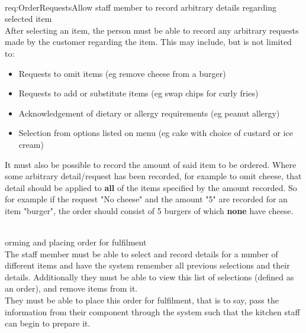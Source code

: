 \documentclass[11pt, a4paper]{report}
\def\itempar#1\\{\item \textbf{#1}\\} %
\begin{document}
\begin{enumerate}[label=F-UR-\arabic*, series=functional]
\begin{enumerate}[label*=.\arabic*]
\itempar \label{req:OrderRequests}Allow staff member to record arbitrary details regarding selected item\\
After selecting an item, the person must be able to record any arbitrary requests made by the customer regarding the item. This may include, but is not limited to: 
\begin{itemize}
\item Requests to omit items (eg remove cheese from a burger)
\item Requests to add or substitute items (eg swap chips for curly fries)
\item Acknowledgement of dietary or allergy requirements (eg peanut allergy)
\item Selection from options listed on menu (eg cake with choice of custard or ice cream)
\end{itemize}
It must also be possible to record the amount of said item to be ordered. Where some arbitrary detail/request has been recorded, for example to omit cheese, that detail should be applied to \textbf{all} of the items specified by the amount recorded. So for example if the request "No cheese" and the amount "5" are recorded for an item "burger", the order should consist of 5 burgers of which \textbf{none} have cheese.

\itempar Forming and placing order for fulfilment\\
The staff member must be able to select and record details for a number %
of different items and have the system remember all previous selections and their details. Additionally they must be able to view this list of selections (defined as an order), and remove items from it.\\
They must be able to place this order for fulfilment, that is to say, pass the information from their component through the system such that the kitchen staff can begin to prepare it.
\end{enumerate}



\end{enumerate}
\end{document}
